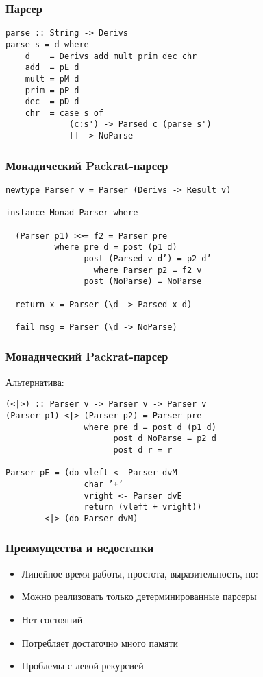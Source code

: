 \documentclass{beamer}
\begin{document}
\begin{frame}[fragile]
  \transwipe[direction=90]
  \frametitle{Парсер}
\begin{verbatim}
parse :: String -> Derivs
parse s = d where
    d    = Derivs add mult prim dec chr
    add  = pE d
    mult = pM d
    prim = pP d
    dec  = pD d
    chr  = case s of
             (c:s') -> Parsed c (parse s')
             [] -> NoParse
\end{verbatim}
\end{frame}

\begin{frame}[fragile]
  \transwipe[direction=90]
  \frametitle{Монадический Packrat-парсер}
\begin{verbatim}
newtype Parser v = Parser (Derivs -> Result v)             

instance Monad Parser where
  
  (Parser p1) >>= f2 = Parser pre
          where pre d = post (p1 d)
                post (Parsed v d’) = p2 d’
                  where Parser p2 = f2 v
                post (NoParse) = NoParse
  
  return x = Parser (\d -> Parsed x d)
  
  fail msg = Parser (\d -> NoParse)
\end{verbatim}
\end{frame}

\begin{frame}[fragile]
  \transwipe[direction=90]
  \frametitle{Монадический Packrat-парсер}
Альтернатива: 
\begin{verbatim}
(<|>) :: Parser v -> Parser v -> Parser v
(Parser p1) <|> (Parser p2) = Parser pre
                where pre d = post d (p1 d)
                      post d NoParse = p2 d
                      post d r = r

Parser pE = (do vleft <- Parser dvM
                char ’+’
                vright <- Parser dvE
                return (vleft + vright))
        <|> (do Parser dvM)

\end{verbatim}
\end{frame}


\begin{frame}[fragile]
  \transwipe[direction=90]
  \frametitle{Преимущества и недостатки}
\begin{itemize}
  \item Линейное время работы, простота, выразительность, но:
\end{itemize}
\begin{itemize}
  \item Можно реализовать только детерминированные парсеры
  \item Нет состояний
  \item Потребляет достаточно много памяти
  \item Проблемы с левой рекурсией
\end{itemize}
\end{frame}
\end{document}
